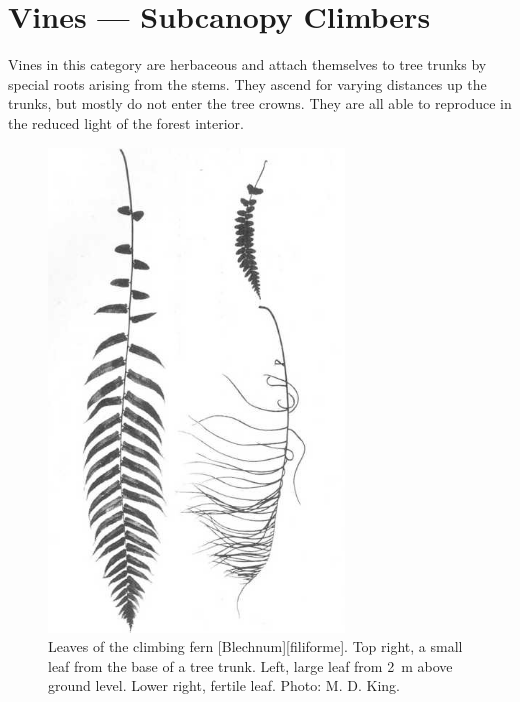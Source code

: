 \section{Vines --- Subcanopy Climbers}

Vines in this category are herbaceous and attach themselves to tree trunks by special roots arising from the stems.
They ascend for varying distances up the trunks, but mostly do not enter the tree crowns.
They are all able to reproduce in the reduced light of the forest interior.

\begin{figure}[htb]
	\centering
	\begin{minipage}[t]{0.486\textwidth}
		\centering
		\includegraphics[width=0.7\textwidth]{graphics/figure27fern.jpg}
    	\caption[Leaves of the climbing fern \emph{Blechnum filiforme}]{Leaves of the climbing fern [Blechnum][filiforme].
    	Top right, a small leaf from the base of a tree trunk.
    	Left, large leaf from \SI{2}{\metre} above ground level.
    	Lower right, fertile leaf.
    	Photo: M. D. King.}%
    	\label{fig:27fern}
	\end{minipage}\hfill%
	\begin{minipage}[t]{0.494\textwidth}

\end{minipage}
\end{figure}
